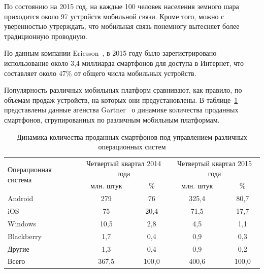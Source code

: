 По состоянию на 2015 год, на каждые 100 человек населения земного шара
приходится около 97 устройств мобильной связи.
Кроме того, можно с уверенностью утрерждать, что мобильная связь понемногу
вытесняет более традиционную проводную.

По данным компании Ericsson~\cite{ericsson_mobility_report},
в 2015 году было зарегистрировано использование около 3{,}4
миллиарда смартфонов для доступа в Интернет,
что составляет около 47\% от общего числа мобильных устройств.

Популярность различных мобильных платформ сравнивают, как правило,
по объемам продаж устройств, на которых они предустановлены.
В таблице~\ref{tbl:system_spec_stat_platforms} представлены данные
агенства Gartner~\cite{gartner_smartphone_stat} о динамике количества
проданных смартфонов, сгрупированных по различным мобильным платформам.

\begin{table}[h]
  \caption{
    Динамика количества проданных смартфонов под
    управлением различных операционных систем
  }\label{tbl:system_spec_stat_platforms}
    \begin{tabular}{| m{6cm} | c | c | c | c |}
      \hline
      \multirow{2}{*}{
      \parbox{6cm}{
      \smallskip
      \centering Операционная система
      \smallskip
      }
      }
      & \multicolumn{2}{c|}{
          \parbox{4.5cm}{
            \smallskip
            \centering Четвертый квартал 2014 года
            \smallskip
          }
        }
      & \multicolumn{2}{c|}{
          \parbox{4.5cm}{
            \smallskip
            \centering Четвертый квартал 2015 года
            \smallskip
          }
        } \\
      \cline{2-5}

      & млн. штук & \% & млн. штук & \% \\
      \hline

      Android &  279 & 76 & 325{,}4 & 80{,}7 \\
      \hline

      iOS &  75 & 20{,}4 & 71{,}5 & 17{,}7 \\
      \hline

      Windows & 10{,}5 & 2{,}8 & 4{,}5 & 1{,}1 \\
      \hline

      Blackberry & 1{,}7 & 0{,}4 & 0{,}9 & 0{,}3 \\
      \hline

      Другие & 1{,}3 & 0{,}4 & 0{,}9 & 0{,}2 \\
      \hline

      Всего & 367{,}5 & 100{,}0 & 400{,}6 & 100{,}0 \\
      \hline
    \end{tabular}
\end{table}
\vspace{-2.5mm}

